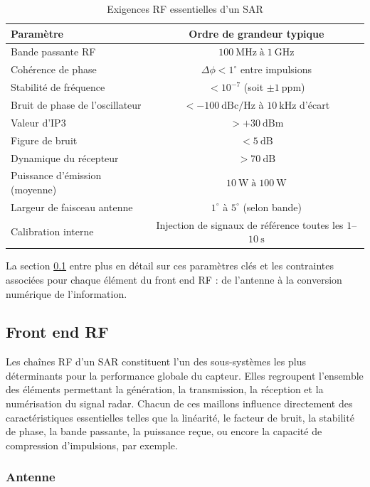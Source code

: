 \begin{table}[H]
\centering
\renewcommand{\arraystretch}{1.3}
\begin{tabular}{l c}
\hline
\textbf{Paramètre} & \textbf{Ordre de grandeur typique} \\ \hline
Bande passante RF & $100~\text{MHz} \; \text{à} \; 1~\text{GHz}$ \\
Cohérence de phase & $\Delta \phi < 1^\circ$ entre impulsions \\
Stabilité de fréquence & $< 10^{-7}$ (soit $\pm 1~\text{ppm}$) \\
Bruit de phase de l’oscillateur & $< -100~\text{dBc/Hz}$ à $10~\text{kHz}$ d’écart \\
Valeur d'IP3 & $> +30~\text{dBm}$ \\
Figure de bruit & $< 5~\text{dB}$ \\
Dynamique du récepteur & $> 70~\text{dB}$ \\
Puissance d’émission (moyenne) & $10~\text{W} \; \text{à} \; 100~\text{W}$ \\
Largeur de faisceau antenne & $1^\circ$ à $5^\circ$ (selon bande) \\
Calibration interne & Injection de signaux de référence toutes les $1$--$10~\text{s}$ \\ \hline
\end{tabular}
\caption{Exigences RF essentielles d'un SAR}
\label{tab:comparison}
\end{table}

La section \ref{subsec:Front end RF} entre plus en détail sur ces paramètres clés et les contraintes associées pour chaque élément du front end RF : de l'antenne à la conversion numérique de l'information.

\subsection{Front end RF}\label{subsec:Front end RF}

Les chaînes RF d’un SAR constituent l’un des sous-systèmes les plus déterminants pour la performance globale du capteur. Elles regroupent l’ensemble des éléments permettant la génération, la transmission, la réception et la numérisation du signal radar. Chacun de ces maillons influence directement des caractéristiques essentielles telles que la linéarité, le facteur de bruit, la stabilité de phase, la bande passante, la puissance reçue, ou encore la capacité de compression d’impulsions, par exemple.

\subsubsection{Antenne}

